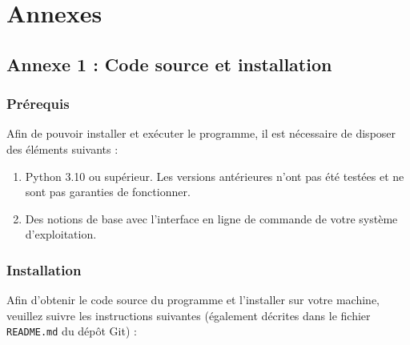 \documentclass[12pt]{scrreprt} %
\begin{document}
\chapter*{Annexes}

\section*{Annexe 1 : Code source et installation}

\subsection*{Prérequis}

Afin de pouvoir installer et exécuter le programme, il est nécessaire de disposer des éléments suivants :
\begin{enumerate}
    \item Python 3.10 ou supérieur. Les versions antérieures n'ont pas été testées et ne sont pas garanties de fonctionner.
    \item Des notions de base avec l'interface en ligne de commande de votre système d'exploitation.
\end{enumerate}

\subsection*{Installation}

Afin d'obtenir le code source du programme et l'installer sur votre machine, veuillez suivre les instructions suivantes (également décrites dans le fichier \texttt{README.md} du dépôt Git) :
\end{document}
